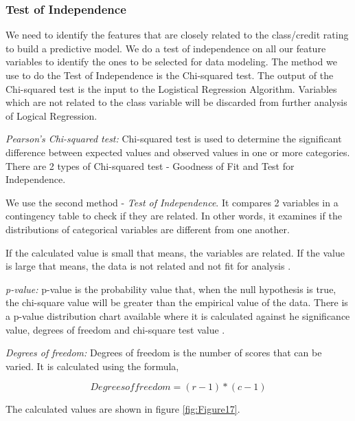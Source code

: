 \documentclass[sigconf]{acmart}
\begin{document}
\subsubsection{Test of Independence}

We need to identify the features that are closely related to the class/credit rating to build a predictive model. We do a test of independence on all our feature variables to identify the ones to be selected for data modeling. The method we use to do the Test of Independence is the Chi-squared test. The output of the Chi-squared test is the input to the Logistical Regression Algorithm. Variables which are not related to the class variable will be discarded from further analysis of Logical Regression. 

\textit{Pearson's Chi-squared test:} Chi-squared test is used to determine the significant difference between expected values and observed values in one or more categories. There are 2 types of Chi-squared test - Goodness of Fit and Test for Independence. 

We use the second method - \emph{Test of Independence}. It compares 2 variables in a contingency table to check if they are related. In other words, it examines if the distributions of categorical variables are different from one another. 


If the calculated value is small that means, the variables are related. If the value is large that means, the data is not related and not fit for analysis \cite{chi-square}.

\textit{p-value:} p-value is the probability value that, when the null hypothesis is true, the chi-square value will be greater than the empirical value of the data. There is a p-value distribution chart available where it is calculated against he significance value, degrees of freedom and chi-square test value \cite{p-value}.

\textit{Degrees of freedom:} Degrees of freedom is the number of scores that can be varied. It is calculated using the formula,

\begin{equation}
Degrees of freedom = (r-1)*(c-1)
\end{equation}

The calculated values are shown in figure \ref{fig:Figure17}.
\end{document}
